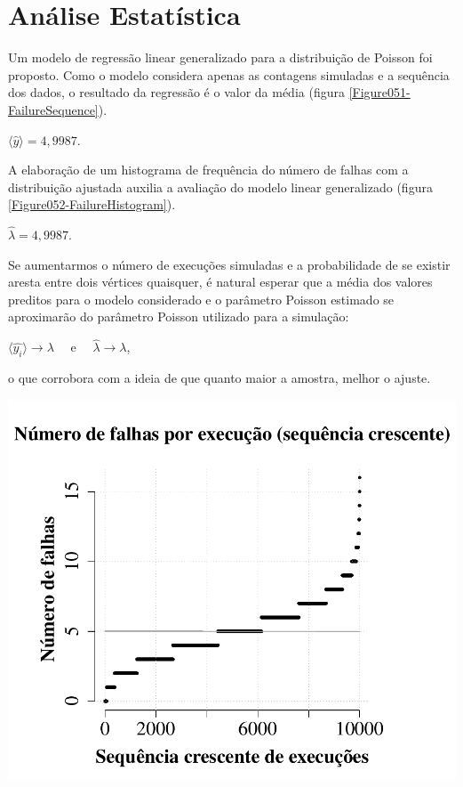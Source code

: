 
\section{Análise Estatística}

Um modelo de regressão linear generalizado para a distribuição de Poisson foi
proposto. Como o modelo considera apenas as contagens simuladas e a sequência
dos dados, o resultado da regressão é o valor da média (figura
\ref{Figure051-FailureSequence}).

\begin{center}
  $\langle\hat{y}\rangle = 4,9987$.
\end{center}

A elaboração de um histograma de frequência do número de falhas com a
distribuição ajustada auxilia a avaliação do modelo linear generalizado
(figura \ref{Figure052-FailureHistogram}).

\begin{center}
  $\hat{\lambda}=4,9987$.
\end{center}

Se aumentarmos o número de execuções simuladas e a probabilidade de se existir
aresta entre dois vértices quaisquer, é natural esperar que a média dos valores
preditos para o modelo considerado e o parâmetro Poisson estimado se aproximarão
do parâmetro Poisson utilizado para a simulação:

\begin{center}
  $\langle\hat{y_i}\rangle \longrightarrow \lambda \quad$ e $\quad \hat{\lambda}
  \longrightarrow \lambda$,
\end{center}

\noindent o que corrobora com a ideia de que quanto maior a amostra, melhor o
ajuste.

{
  \centering
  \captionsetup{type=figure}
	\includegraphics[scale=0.45]{./figures/Figure051-FailureSequence.pdf}
	\label{Figure051-FailureSequence}
}

